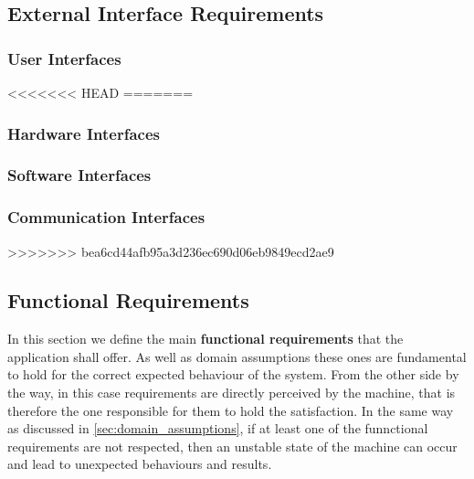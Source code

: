 \subsection{External Interface Requirements}
\subsubsection{User Interfaces}
\vspace{-6mm}

<<<<<<< HEAD
=======
\subsubsection{Hardware Interfaces}

\subsubsection{Software Interfaces}

\subsubsection{Communication Interfaces}

>>>>>>> bea6cd44afb95a3d236ec690d06eb9849ecd2ae9

\subsection{Functional Requirements}
In this section we define the main \textbf{functional requirements} that the application shall offer. As well as domain assumptions these ones are fundamental to hold for the correct expected behaviour of the system. From the other side by the way, in this case requirements are directly perceived by the machine, that is therefore the one responsible for them to hold the satisfaction. In the same way as discussed in \ref{sec:domain_assumptions}, if at least one of the funnctional requirements are not respected, then an unstable state of the machine can occur and lead to unexpected behaviours and results.
\newline\newline
{}
\newline\newline
{}
\newline\newline
{}

